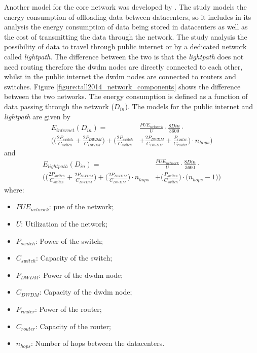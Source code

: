 Another model for the core network was developed by \citet{Taal2014}. The study models the energy consumption of offloading data between datacenters, so it includes in  its analysis the energy consumption of data being stored in datacenters as well as the cost of transmitting the data through the network. 
The study analysis the possibility of data to travel through public internet or by a dedicated network called \textit{lightpath}. The difference between the two is that the \textit{lightpath} does not need routing therefore the \ac{dwdm} nodes are directly connected to each other, whilst in the public internet the \ac{dwdm} nodes are connected to routers and switches. Figure \ref{figure:tall2014_network_components} shows the difference between the two networks. The energy consumption is defined as a function of data passing through the network ($D_{in}$). The models for the public internet and \textit{lightpath} are given by
% 
\begin{equation}
\label{formula:tall_public_internet}
\begin{split}
    E_{internet}(D_{in}) = & \frac{PUE_{network}}{U} \cdot \frac{8D{in}}{3600} \cdot \\
    \Bigg( \bigg( \frac{2P_{switch}}{C_{switch}} + \frac{2P_{DWDM}}{C_{DWDM}} \bigg) + \bigg(\frac{2P_{switch}}{C_{switch}} & + \frac{2P_{DWDM}}{C_{DWDM}} + \frac{P_{router}}{C_{router}}\bigg) \cdot n_{hops} \Bigg)
\end{split}
\end{equation}
and
\begin{equation}
\label{formula:tall_lightpath}
\begin{split}
    E_{lightpath}(D_{in}) = & \frac{PUE_{network}}{U} \cdot \frac{8D{in}}{3600} \cdot \\
    \Bigg( \bigg( \frac{2P_{switch}}{C_{switch}} + \frac{2P_{DWDM}}{C_{DWDM}} \bigg) + \bigg(\frac{2P_{DWDM}}{C_{DWDM}}\bigg) \cdot n_{hops} & + \bigg( \frac{P_{switch}}{C_{switch}} \bigg) \cdot \bigg( n_{hops} - 1 \bigg) \Bigg)
\end{split}
\end{equation}
%
where:
\begin{itemize}
    \item $PUE_{network}$: \ac{pue} of the network;
    \item $U$: Utilization of the network;
    \item $P_{switch}$: Power of the switch;
    \item $C_{switch}$: Capacity of the switch;
    \item $P_{DWDM}$: Power of the \ac{dwdm} node;
    \item $C_{DWDM}$: Capacity of the \ac{dwdm} node;
    \item $P_{router}$: Power of the router;
    \item $C_{router}$: Capacity of the router;
    \item $n_{hops}$: Number of hops between the datacenters.
\end{itemize}

